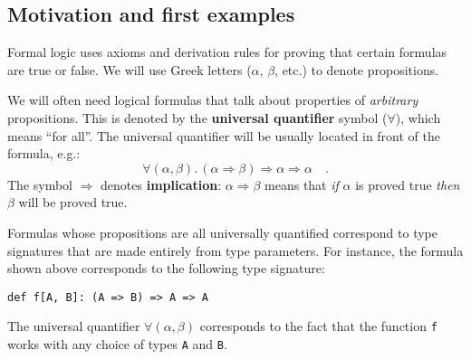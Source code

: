 \subsection{Motivation and first examples\label{subsec:ch-Motivation-and-first-examples}}

Formal logic uses axioms and derivation rules for proving that certain
formulas are true or false. We will use Greek letters ($\alpha$,
$\beta$, etc.) to denote propositions.

We will often need logical formulas that talk about properties of
\emph{arbitrary} propositions. This is denoted by the \textbf{universal
quantifier}
symbol ($\forall$), which means \textsf{``}for all\textsf{''}. The universal quantifier
will be usually located in front of the formula, e.g.:
\[
\forall(\alpha,\beta).\,\left(\alpha\Rightarrow\beta\right)\Rightarrow\alpha\Rightarrow\alpha\quad.
\]
The symbol $\Rightarrow$ denotes \textbf{implication}:
$\alpha\Rightarrow\beta$ means that \emph{if} $\alpha$ is proved
true \emph{then} $\beta$ will be proved true.

Formulas whose propositions are all universally quantified correspond
to type signatures that are made entirely from type parameters. For
instance, the formula shown above corresponds to the following type
signature:
\begin{lstlisting}
def f[A, B]: (A => B) => A => A
\end{lstlisting}
The universal quantifier $\forall(\alpha,\beta)$ corresponds to the
fact that the function \lstinline!f! works with any choice of types
\lstinline!A! and \lstinline!B!.


